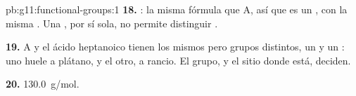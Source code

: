 \begin{solution}{pb:g11:functional-groups:1}
\textbf{18.} : la misma fórmula que A, así que es un
, con la misma . Una , por sí sola, no
permite distinguir .

\textbf{19.} A y el ácido heptanoico tienen los mismos  pero
grupos distintos, un  y un : uno huele a plátano,
y el otro, a rancio. El grupo, y el sitio donde está, deciden.

\textbf{20.} \qty{130.0}{g/mol}.
\end{solution}
